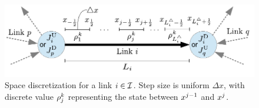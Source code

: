 \begin{figure}
\begin{centering}
\includegraphics[width=0.6\columnwidth]{figs-gen/dx}
\par\end{centering}

\caption{Space discretization for a link $i\in\mathcal{I}$. Step size is uniform
$\Delta x$, with discrete value $\rho_{j}^{k}$ representing
the state between $x^{j-1}$ and $x^{j}$.\label{fig:Space-discretization-for}}


\end{figure}

